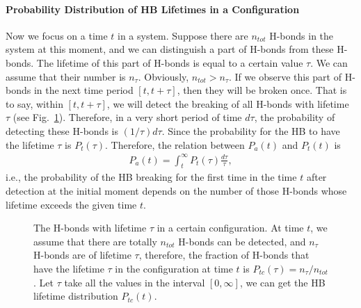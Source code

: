 \paragraph{Probability Distribution of HB Lifetimes in a Configuration}
Now we focus on a time $t$ in a system. Suppose there are $n_{tot}$ H-bonds in the system at this moment, and we can distinguish a part of H-bonds from these H-bonds. 
The lifetime of this part of H-bonds is equal to a certain value $\tau$. We can assume that their number is $n_\tau$. 
Obviously, $n_{tot}>n_\tau$. If we observe this part of H-bonds in the next time period $[t, t+\tau]$, then they will be broken once. 
That is to say, within $[t,t+\tau]$, we will detect the breaking of all H-bonds with lifetime $\tau$ (see Fig.~\ref{fig:P_tc}).  
Therefore, in a very short period of time $d\tau$, the probability of detecting these H-bonds is $(1/\tau)d\tau$.
Since the probability for the HB to have the lifetime $\tau$ is $P_t(\tau)$. Therefore, the relation between $P_a(t)$ and $P_t(t)$ is
\begin{eqnarray}
P_a(t) = \int_t^\infty P_t(\tau)\frac{d\tau}{\tau},
\label{eq:Pt_and_P}
\end{eqnarray}
i.e., the probability of the HB breaking for the first time in the time $t$ after detection at the initial moment depends on 
the number of those H-bonds whose lifetime exceeds the given time $t$. \cite{VPV09}
\begin{figure}
\centering
{}
  \caption{\label{fig:P_tc} The H-bonds with lifetime $\tau$ in a certain configuration. 
At time $t$, we assume that there are totally $n_{tot}$ H-bonds can be detected, and $n_{\tau}$ H-bonds are of lifetime $\tau$, therefore,  the fraction of H-bonds that 
have the lifetime $\tau$ in the configuration at time $t$ is $P_{tc}(\tau) =  n_{\tau} /n_{tot}$.
Let $\tau$ take all the values in the interval $[0,\infty]$, we can get the HB lifetime distribution $P_{tc}(t)$.
}
\end{figure}
